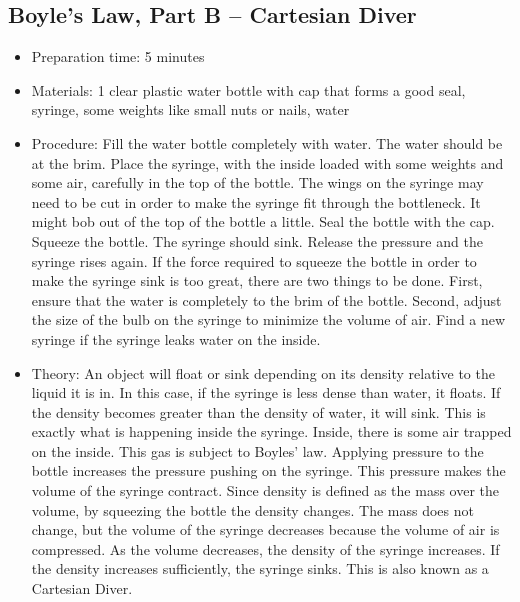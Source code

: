 \subsection{Boyle's Law, Part B -- Cartesian Diver}
\begin{itemize}
\item{Preparation time: 5 minutes}
\item{Materials: 1 clear plastic water bottle with cap that forms a good seal, syringe, some weights like small nuts or nails, water}
\item{Procedure: Fill the water bottle completely with water. The water should be at the brim. Place the syringe, with the inside loaded with some weights and some air, carefully in the top of the bottle. The wings on the syringe may need to be cut in order to make the syringe fit through the bottleneck. It might bob out of the top of the bottle a little. Seal the bottle with the cap. Squeeze the bottle. The syringe should sink. Release the pressure and the syringe rises again. If the force required to squeeze the bottle in order to make the syringe sink is too great, there are two things to be done. First, ensure that the water is completely to the brim of the bottle. Second, adjust the size of the bulb on the syringe to minimize the volume of air. Find a new syringe if the syringe leaks water on the inside.}
\item{Theory: An object will float or sink depending on its density relative to the liquid it is in. In this case, if the syringe is less dense than water, it floats. If the density becomes greater than the density of water, it will sink. This is exactly what is happening inside the syringe. Inside, there is some air trapped on the inside. This gas is subject to Boyles’ law. Applying pressure to the bottle increases the pressure pushing on the syringe. This pressure makes the volume of the syringe contract. Since density is defined as the mass over the volume, by squeezing the bottle the density changes. The mass does not change, but the volume of the syringe decreases because the volume of air is compressed. As the volume decreases, the density of the syringe increases. If the density increases sufficiently, the syringe sinks. This is also known as a Cartesian Diver.}
\end{itemize}

